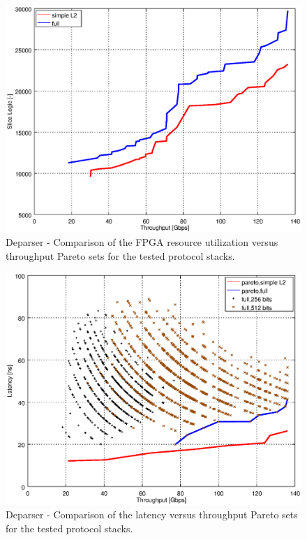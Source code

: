 \begin{figure}
    \centering
    \includegraphics[scale=0.61]{chapters/pic/graphs/deparser/1_thr_slice_logic_pareto}
    \caption{Deparser - Comparison of the FPGA resource utilization versus throughput Pareto sets for the tested protocol stacks.}
    \label{fig:deparserParetoLut}
\end{figure}

\begin{figure}
    \centering
    \includegraphics[scale=0.61]{chapters/pic/graphs/deparser/3_thr_latency_deparser.eps}
    \caption{Deparser - Comparison of the latency versus throughput Pareto sets for the tested protocol stacks.}
    \label{fig:deparserParetoLatency}
\end{figure}

